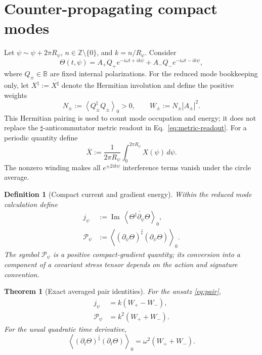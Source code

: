 \documentclass[11pt]{article}
\newtheorem{theorem}{Theorem}
\newtheorem{definition}{Definition}
\newcommand{\B}{\mathbb B}
\newcommand{\avg}[1]{\overline{#1}}
\newcommand{\grade}[2]{\left\langle #1\right\rangle_{#2}}
\begin{document}
\section{Counter-propagating compact modes}
Let \(\psi\sim\psi+2\pi R_\psi\), \(n\in\mathbb Z\setminus\{0\}\), and
\(k=n/R_\psi\).  Consider
\begin{equation}
 \Theta(t,\psi)
 =A_+Q_+e^{-i\omega t+ik\psi}
 +A_-Q_-e^{-i\omega t-ik\psi},
 \label{eq:pair}
\end{equation}
where \(Q_\pm\in\B\) are fixed internal polarizations.  For the reduced
mode bookkeeping only, let \(X^\ddagger:=\overline{X^\sharp}\) denote the
Hermitian involution and define the positive weights
\begin{equation}
 N_\pm:=\grade{Q_\pm^\ddagger Q_\pm}{0}>0,
 \qquad
 W_\pm:=N_\pm|A_\pm|^2.
\end{equation}
This Hermitian pairing is used to count mode occupation and energy; it does not
replace the \(\sharp\)-anticommutator metric readout in
Eq.~\eqref{eq:metric-readout}.
For a periodic quantity define
\begin{equation}
 \avg{X}:=\frac{1}{2\pi R_\psi}
 \int_0^{2\pi R_\psi}X(\psi)\,d\psi.
\end{equation}
The nonzero winding makes all \(e^{\pm2ik\psi}\) interference terms vanish
under the circle average.

\begin{definition}[Compact current and gradient energy]
Within the reduced mode calculation define
\begin{align}
 j_\psi&:=\operatorname{Im}\,
 \grade{\avg{\Theta^\ddagger\partial_\psi\Theta}}{0},\\
 \mathcal P_\psi&:=
 \grade{\avg{(\partial_\psi\Theta)^\ddagger
                         (\partial_\psi\Theta)}}{0}.
\end{align}
The symbol \(\mathcal P_\psi\) is a positive compact-gradient quantity; its
conversion into a component of a covariant stress tensor depends on the action
and signature convention.
\end{definition}

\begin{theorem}[Exact averaged pair identities]
For the ansatz \eqref{eq:pair},
\begin{align}
 j_\psi&=k(W_+-W_-),
 \label{eq:j}\tag{K1}\\
 \mathcal P_\psi&=k^2(W_++W_-).
 \label{eq:p}\tag{K2}
\end{align}
For the usual quadratic time derivative,
\begin{equation}
 \grade{\avg{(\partial_t\Theta)^\ddagger(\partial_t\Theta)}}{0}
 =\omega^2(W_++W_-).
 \label{eq:et}
\end{equation}
\end{theorem}
\end{document}
